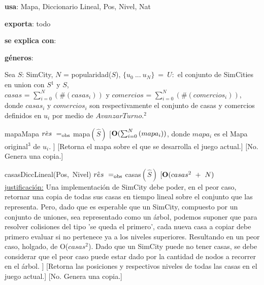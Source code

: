\begin{Interfaz}

    \textbf{usa}: Mapa, Diccionario Lineal, Pos, Nivel, Nat 
    
    \textbf{exporta}: todo

    \textbf{se explica con}: 
  
    \textbf{géneros}: 
    
    
    Sea $S$: SimCity, $N$ = popularidad($S$), $\{u_0\ ...\ u_{N}\}\ =\ U:$ el conjunto de SimCities en union con $S$$^{1}$ y $S$, \\
    $casas$ = $\sum_{i = 0}^{N}{}(\#(casas_i))$ y $comercios$ = $\sum_{i = 0}^{N}{}(\#(comercios_i))$, donde $casas_i$ y $comercios_i$
    son respectivamente el conjunto de casas y comercios definidos en $u_i$ por medio de $AvanzarTurno$.$^{2}$ 

    \InterfazFuncion
    {mapa}{}{Mapa}
    {$\hat{res}\ \igobs\ $mapa$(\hat{S})$}
    [$\bold{O}(\sum_{i = 0}^{N}{}(mapa_i))$,
        donde $mapa_i$ es el Mapa original$^{3}$ de $u_i$.
    ]
    [Retorna el mapa sobre el que se desarrolla el juego actual.]
    [No. Genera una copia.]

    \InterfazFuncion
    {casas}{}{DiccLineal(Pos,\ Nivel)}
    {$\hat{res}\ \igobs\ $casas$(\hat{S})$}
    [$\bold{O}(casas^{2}\ +\ N)$ %
        \\ \underline{justificación:} Una implementación de SimCity debe poder, en el peor caso, retornar una copia de todas sus casas en tiempo lineal sobre el conjunto que las representa. Pero, dado que es esperable que un SimCity, compuesto por un conjunto de uniones, sea representado como un árbol, podemos suponer que para resolver colisiones del tipo 'se queda el primero', cada nueva casa a copiar debe primero evaluar si no pertenece ya a los niveles superiores. Resultando en un peor caso, holgado, de O($casas^2$). Dado que un SimCity puede no tener casas, se debe considerar que el peor caso puede estar dado por la cantidad de nodos a recorrer en el árbol.
    ]
    [Retorna las posiciones y respectivos niveles de todas las casas en el juego actual.]
    [No. Genera una copia.]


\end{Interfaz}
